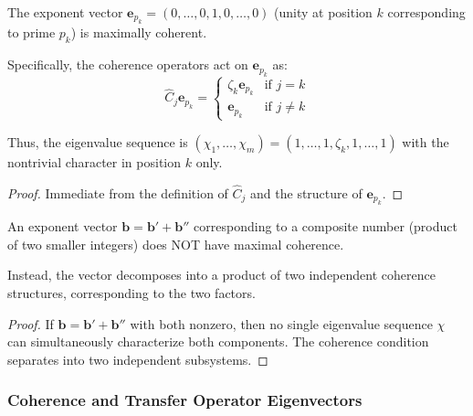 \begin{proposition}
\label{prop:prime-coherent}
The exponent vector $\mathbf{e}_{p_k} = (0, \ldots, 0, 1, 0, \ldots, 0)$ (unity at position $k$ corresponding to prime $p_k$) is maximally coherent.

Specifically, the coherence operators act on $\mathbf{e}_{p_k}$ as:
\begin{equation}
\hat{C}_j \mathbf{e}_{p_k} = \begin{cases}
\zeta_k \mathbf{e}_{p_k} & \text{if } j = k \\
\mathbf{e}_{p_k} & \text{if } j \neq k
\end{cases}
\end{equation}

Thus, the eigenvalue sequence is $(\chi_1, \ldots, \chi_m) = (1, \ldots, 1, \zeta_k, 1, \ldots, 1)$ with the nontrivial character in position $k$ only.
\end{proposition}

\begin{proof}
Immediate from the definition of $\hat{C}_j$ and the structure of $\mathbf{e}_{p_k}$.
\end{proof}

\begin{proposition}
\label{prop:composite-incoherent}
An exponent vector $\mathbf{b} = \mathbf{b}' + \mathbf{b}''$ corresponding to a composite number (product of two smaller integers) does NOT have maximal coherence.

Instead, the vector decomposes into a product of two independent coherence structures, corresponding to the two factors.
\end{proposition}

\begin{proof}
If $\mathbf{b} = \mathbf{b}' + \mathbf{b}''$ with both nonzero, then no single eigenvalue sequence $\chi$ can simultaneously characterize both components. The coherence condition separates into two independent subsystems.
\end{proof}

\subsubsection{Coherence and Transfer Operator Eigenvectors}

